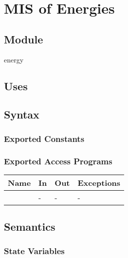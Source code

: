 \documentclass[12pt, titlepage]{article}
\begin{document}
\newpage



\section{MIS of Energies} \label{section-energies}



\subsection{Module}

energy

\subsection{Uses}


\subsection{Syntax}

\subsubsection{Exported Constants}

\subsubsection{Exported Access Programs}

\begin{center}
	\begin{tabular}{p{2cm} p{4cm} p{4cm} p{2cm}}
		\hline
		\textbf{Name} & \textbf{In} & \textbf{Out} & \textbf{Exceptions} \\
		\hline
		\wss{accessProg} & - & - & - \\
		\hline
	\end{tabular}
\end{center}

\subsection{Semantics}

\subsubsection{State Variables}
\end{document}
